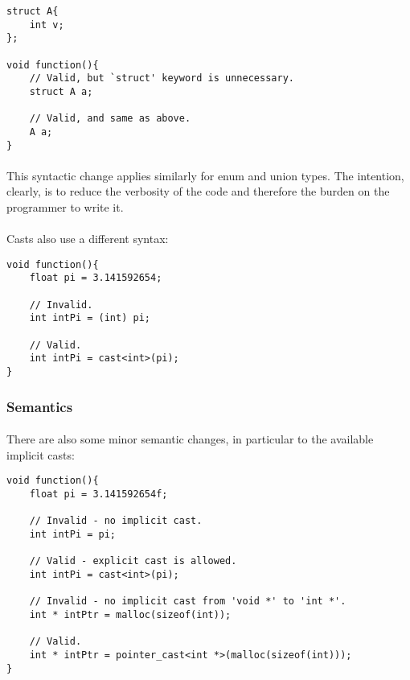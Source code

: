 \documentclass[12pt,twoside,notitlepage]{report}
\begin{document}
\small{
\begin{verbatim}
struct A{
    int v;
};

void function(){
    // Valid, but `struct' keyword is unnecessary.
    struct A a;
    
    // Valid, and same as above.
    A a;
}
\end{verbatim}
}

\paragraph{}
This syntactic change applies similarly for enum and union types. The intention, clearly, is to reduce the verbosity of the code and therefore the burden on the programmer to write it.

\paragraph{}
Casts also use a different syntax:

\small{
\begin{verbatim}
void function(){
    float pi = 3.141592654;
    
    // Invalid.
    int intPi = (int) pi;
    
    // Valid.
    int intPi = cast<int>(pi);
}
\end{verbatim}
}

\subsubsection{Semantics}

\paragraph{}
There are also some minor semantic changes, in particular to the available implicit casts:

\small{
\begin{verbatim}
void function(){
    float pi = 3.141592654f;
    
    // Invalid - no implicit cast.
    int intPi = pi;
    
    // Valid - explicit cast is allowed.
    int intPi = cast<int>(pi);
    
    // Invalid - no implicit cast from 'void *' to 'int *'.
    int * intPtr = malloc(sizeof(int));
    
    // Valid.
    int * intPtr = pointer_cast<int *>(malloc(sizeof(int)));
}
\end{verbatim}
}
\end{document}
